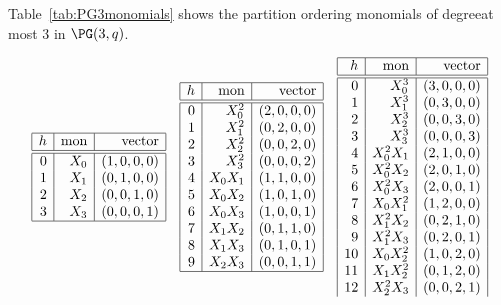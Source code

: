 Table~\ref{tab:PG3monomials} shows the partition ordering monomials of 
degreeat most $3$ in $\PG(3,q)$.
\begin{table}
$$
\begin{array}{|r|r|r|}
\hline
h &  \mbox{mon} & \mbox{vector} \\
\hline
\hline
0 & X_0 & ( 1, 0, 0, 0 )\\
1 & X_1 & ( 0, 1, 0, 0 )\\
2 & X_2 & ( 0, 0, 1, 0 )\\
3 & X_3 & ( 0, 0, 0, 1 )\\
\hline
\end{array}
\quad
\begin{array}{|r|r|r|}
\hline
h &  \mbox{mon} & \mbox{vector} \\
\hline
\hline
0 & X_0^2 & ( 2, 0, 0, 0 )\\
1 & X_1^2 & ( 0, 2, 0, 0 )\\
2 & X_2^2 & ( 0, 0, 2, 0 )\\
3 & X_3^2 & ( 0, 0, 0, 2 )\\
4 & X_0X_1 & ( 1, 1, 0, 0 )\\
5 & X_0X_2 & ( 1, 0, 1, 0 )\\
6 & X_0X_3 & ( 1, 0, 0, 1 )\\
7 & X_1X_2 & ( 0, 1, 1, 0 )\\
8 & X_1X_3 & ( 0, 1, 0, 1 )\\
9 & X_2X_3 & ( 0, 0, 1, 1 )\\
\hline
\end{array}
\quad
\begin{array}{|r|r|r|}
\hline
h &  \mbox{mon} & \mbox{vector} \\
\hline
\hline
0 & X_0^3 & ( 3, 0, 0, 0 )\\
1 & X_1^3 & ( 0, 3, 0, 0 )\\
2 & X_2^3 & ( 0, 0, 3, 0 )\\
3 & X_3^3 & ( 0, 0, 0, 3 )\\
4 & X_0^2X_1 & ( 2, 1, 0, 0 )\\
5 & X_0^2X_2 & ( 2, 0, 1, 0 )\\
6 & X_0^2X_3 & ( 2, 0, 0, 1 )\\
7 & X_0X_1^2 & ( 1, 2, 0, 0 )\\
8 & X_1^2X_2 & ( 0, 2, 1, 0 )\\
9 & X_1^2X_3 & ( 0, 2, 0, 1 )\\
10 & X_0X_2^2 & ( 1, 0, 2, 0 )\\
11 & X_1X_2^2 & ( 0, 1, 2, 0 )\\
12 & X_2^2X_3 & ( 0, 0, 2, 1 )\\

\end{array}$$
\end{table}
